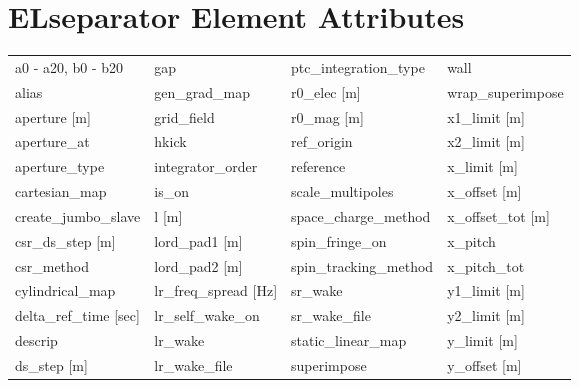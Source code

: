  \section{ELseparator Element Attributes}
 \label{s:list.elseparator}
 
 \begin{tabular}{llll} \toprule
a0 - a20, b0 - b20               & gap                              & ptc_integration_type             & wall                             \\
alias                            & gen_grad_map                     & r0_elec [m]                      & wrap_superimpose                 \\
aperture [m]                     & grid_field                       & r0_mag [m]                       & x1_limit [m]                     \\
aperture_at                      & hkick                            & ref_origin                       & x2_limit [m]                     \\
aperture_type                    & integrator_order                 & reference                        & x_limit [m]                      \\
cartesian_map                    & is_on                            & scale_multipoles                 & x_offset [m]                     \\
create_jumbo_slave               & l [m]                            & space_charge_method              & x_offset_tot [m]                 \\
csr_ds_step [m]                  & lord_pad1 [m]                    & spin_fringe_on                   & x_pitch                          \\
csr_method                       & lord_pad2 [m]                    & spin_tracking_method             & x_pitch_tot                      \\
cylindrical_map                  & lr_freq_spread [Hz]              & sr_wake                          & y1_limit [m]                     \\
delta_ref_time [sec]             & lr_self_wake_on                  & sr_wake_file                     & y2_limit [m]                     \\
descrip                          & lr_wake                          & static_linear_map                & y_limit [m]                      \\
ds_step [m]                      & lr_wake_file                     & superimpose                      & y_offset [m]                     \\

\end{tabular}
